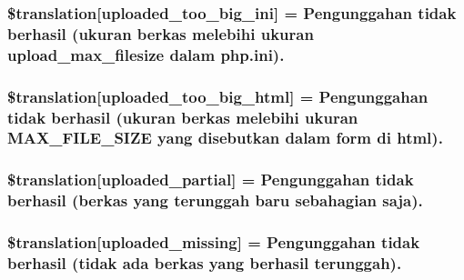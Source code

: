 \subsubsection[{\$translation}]{\setlength{\rightskip}{0pt plus 5cm}\$translation\mbox{[}\textquotesingle{}uploaded\+\_\+too\+\_\+big\+\_\+ini\textquotesingle{}\mbox{]} = \textquotesingle{}Pengunggahan tidak berhasil (ukuran berkas melebihi ukuran upload\+\_\+max\+\_\+filesize dalam php.\+ini).\textquotesingle{}}\label{class_8upload_8id___i_d_8php_a6a08dcd0d3651fdd098568f6b2f0a42c}
\hypertarget{class_8upload_8id___i_d_8php_a623d5b8b92169f57d7e43458aa911cbb}{}
\subsubsection[{\$translation}]{\setlength{\rightskip}{0pt plus 5cm}\$translation\mbox{[}\textquotesingle{}uploaded\+\_\+too\+\_\+big\+\_\+html\textquotesingle{}\mbox{]} = \textquotesingle{}Pengunggahan tidak berhasil (ukuran berkas melebihi ukuran M\+A\+X\+\_\+\+F\+I\+L\+E\+\_\+\+S\+I\+Z\+E yang disebutkan dalam form di html).\textquotesingle{}}\label{class_8upload_8id___i_d_8php_a623d5b8b92169f57d7e43458aa911cbb}
\hypertarget{class_8upload_8id___i_d_8php_a967c17da21b0a2d3bd65cca3a9ca0ea8}{}
\subsubsection[{\$translation}]{\setlength{\rightskip}{0pt plus 5cm}\$translation\mbox{[}\textquotesingle{}uploaded\+\_\+partial\textquotesingle{}\mbox{]} = \textquotesingle{}Pengunggahan tidak berhasil (berkas yang terunggah baru sebahagian saja).\textquotesingle{}}\label{class_8upload_8id___i_d_8php_a967c17da21b0a2d3bd65cca3a9ca0ea8}
\hypertarget{class_8upload_8id___i_d_8php_a0cce433260be65f1f35853a6b4b8952b}{}
\subsubsection[{\$translation}]{\setlength{\rightskip}{0pt plus 5cm}\$translation\mbox{[}\textquotesingle{}uploaded\+\_\+missing\textquotesingle{}\mbox{]} = \textquotesingle{}Pengunggahan tidak berhasil (tidak ada berkas yang berhasil terunggah).\textquotesingle{}}\label{class_8upload_8id___i_d_8php_a0cce433260be65f1f35853a6b4b8952b}
\hypertarget{class_8upload_8id___i_d_8php_a4a9168e922b827e6a28b5db1c00774ca}{}
